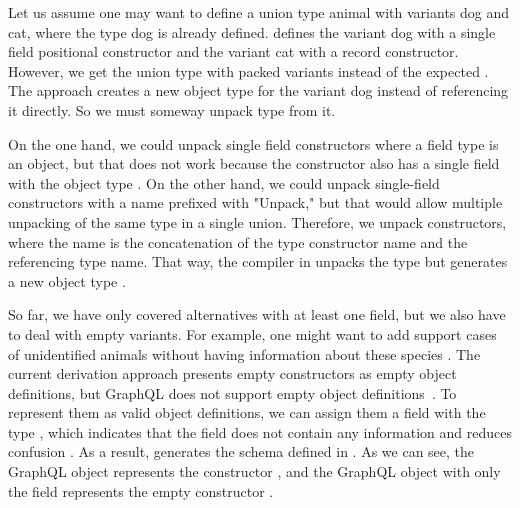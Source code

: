 Let us assume one may want to define a union type animal with variants dog and cat, where the type dog is already defined. 
 defines the variant dog with a single field positional constructor and the variant cat with a record constructor.
However, we get the union type with packed variants  instead of the expected . The approach creates a new object type  for the variant dog instead of referencing it directly. So we must someway unpack type  from it.


On the one hand, we could unpack single field constructors where a field type is an object, but that does not work because the constructor  also has a single field  with the object type .  On the other hand, we could unpack single-field constructors with a name prefixed with "Unpack," but that would allow multiple unpacking of the same type in a single union. Therefore, we unpack constructors, where the name is the concatenation of the type constructor name and the referencing type name. That way, the compiler in  unpacks the type  but generates a new object type .



So far, we have only covered alternatives 
with at least one field, but we also have 
to deal with empty variants. 
For example, one might want to add support 
cases of unidentified animals without having 
information about these species . 
The current derivation approach presents 
empty constructors as empty object definitions, 
but GraphQL does not support empty object 
definitions~\cite{gql-spec}. 
To represent them as valid object definitions, 
we can assign them a field \expr{\_} with the 
type , which indicates that 
the field does not contain any information 
and reduces confusion . 
As a result,  generates the schema defined in . As we can see, the GraphQL object  represents the constructor , and the GraphQL object  with only the field \expr{\_} represents the empty constructor . 

